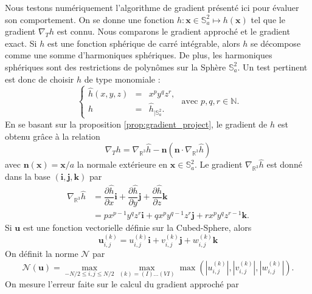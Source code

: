 Nous testons numériquement l'algorithme de gradient présenté ici pour évaluer son comportement. On se donne une fonction $h : \mathbf{x} \in \mathbb{S}_a^2 \mapsto h(\mathbf{x})$ tel que le gradient $\nabla_T h$ est connu. Nous comparons le gradient approché et le gradient exact.
Si $h$ est une fonction sphérique de carré intégrable, alors $h$ se décompose comme une somme d'harmoniques sphériques. De plus, les harmoniques sphériques sont des restrictions de polynômes sur la Sphère $\mathbb{S}_a^2$. Un test pertinent est donc de choisir $h$ de type monomiale :
\begin{equation}
\left\lbrace
\begin{array}{rcl}
\hat{h}(x,y,z) & = & x^p y^q z^r, \\
h & = & \hat{h}_{| \mathbb{S}_a^2}.
\end{array}
\right. \text{ avec } p,q,r \in \mathbb{N}.
\label{eq:grad_test}
\end{equation}
En se basant sur la proposition \ref{prop:gradient_project}, le gradient de $h$ est obtenu grâce à la relation
\begin{equation}
\nabla_T h = \nabla_{\mathbb{R}^3} \hat{h} - \mathbf{n} \left( \mathbf{n} \cdot \nabla_{\mathbb{R}^3} \hat{h} \right)
\end{equation}
avec $\mathbf{n}(\mathbf{x}) = \mathbf{x}/a$ la normale extérieure en $\mathbf{x} \in \mathbb{S}_a^2$. Le gradient $\nabla_{\mathbb{R}^3} \hat{h}$ est donné dans la base $(\mathbf{i}, \mathbf{j}, \mathbf{k})$ par 
\begin{align*}
\nabla_{\mathbb{R}^3} \hat{h} & = \dfrac{\partial \hat{h}}{\partial x} \mathbf{i} + \dfrac{\partial \hat{h}}{\partial y} \mathbf{j} + \dfrac{\partial \hat{h}}{\partial z} \mathbf{k}\\
                              & = p x^{p-1} y^q z^r \mathbf{i} + q x^p y^{q-1} z^r \mathbf{j} + r x^p y^q z^{r-1} \mathbf{k}.
\end{align*}
Si $\mathbf{u}$ est une fonction vectorielle définie sur la Cubed-Sphere, alors
\begin{equation}
\mathbf{u}_{i,j}^{(k)} = u_{i,j}^{(k)} \mathbf{i} + v_{i,j}^{(k)} \mathbf{j} + w_{i,j}^{(k)} \mathbf{k}
\end{equation}
On définit la norme $\mathcal{N}$ par
\begin{equation}
\label{eq:normN}
\mathcal{N}(\mathbf{u}) = \max_{-N/2 \leq i,j \leq N/2} \max_{(k) = (I) \ldots (VI)} \max (|u_{i,j}^{(k)}|, |v_{i,j}^{(k)}|, |w_{i,j}^{(k)}|).
\end{equation}
On mesure l'erreur faite sur le calcul du gradient approché par
